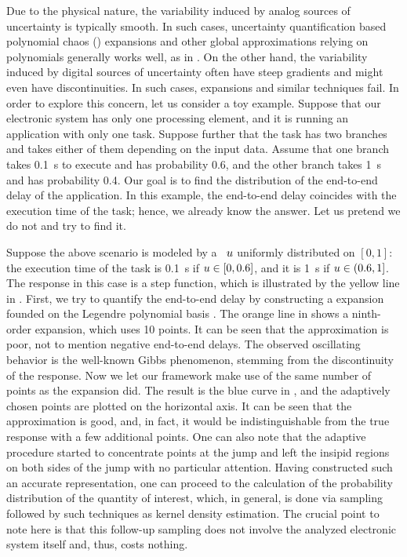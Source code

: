 
Due to the physical nature, the variability induced by analog sources of
uncertainty is typically smooth. In such cases, uncertainty quantification based
polynomial chaos () expansions \cite{xiu2010} and other global
approximations relying on polynomials generally works well, as in
\cite{bhardwaj2008, lee2013, ukhov2014, ukhov2015}. On the other hand, the
variability induced by digital sources of uncertainty often have steep gradients
and might even have discontinuities. In such cases,  expansions and
similar techniques fail. In order to explore this concern, let us consider a toy
example. Suppose that our electronic system has only one processing element, and
it is running an application with only one task. Suppose further that the task
has two branches and takes either of them depending on the input data. Assume
that one branch takes 0.1~s to execute and has probability 0.6, and the other
branch takes 1~s and has probability 0.4. Our goal is to find the distribution
of the end-to-end delay of the application. In this example, the end-to-end
delay coincides with the execution time of the task; hence, we already know the
answer. Let us pretend we do not and try to find it.

Suppose the above scenario is modeled by a \rv\ $u$ uniformly distributed on
$[0, 1]$: the execution time of the task is 0.1~s if $u \in [0, 0.6]$, and it
is 1~s if $u \in (0.6, 1]$. The response in this case is a step function, which
is illustrated by the yellow line in . First, we try to
quantify the end-to-end delay by constructing a  expansion founded on
the Legendre polynomial basis \cite{xiu2010}. The orange line in
 shows a ninth-order  expansion, which uses 10 points.
It can be seen that the approximation is poor, not to mention negative
end-to-end delays. The observed oscillating behavior is the well-known Gibbs
phenomenon, stemming from the discontinuity of the response. Now we let our
framework make use of the same number of points as the  expansion did.
The result is the blue curve in , and the adaptively chosen
points are plotted on the horizontal axis. It can be seen that the approximation
is good, and, in fact, it would be indistinguishable from the true response with
a few additional points. One can also note that the adaptive procedure started
to concentrate points at the jump and left the insipid regions on both sides of
the jump with no particular attention. Having constructed such an accurate
representation, one can proceed to the calculation of the probability
distribution of the quantity of interest, which, in general, is done via
sampling followed by such techniques as kernel density estimation. The crucial
point to note here is that this follow-up sampling does not involve the analyzed
electronic system itself and, thus, costs nothing.


